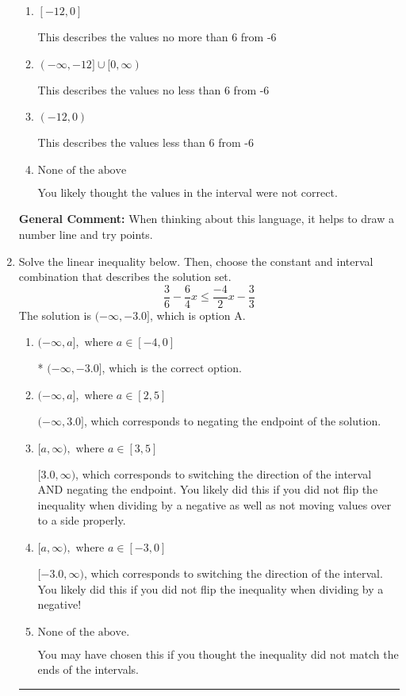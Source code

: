 \documentclass{extbook}[14pt]
\newcommand{\litem}[1]{\item #1

\rule{\textwidth}{0.4pt}}
\begin{document}
\begin{enumerate}
{\begin{enumerate}[label=\Alph*.]
This describes the values more than 6 from -6
\item \( [-12, 0] \)

This describes the values no more than 6 from -6
\item \( (-\infty, -12] \cup [0, \infty) \)

This describes the values no less than 6 from -6
\item \( (-12, 0) \)

This describes the values less than 6 from -6
\item \( \text{None of the above} \)

You likely thought the values in the interval were not correct.
\end{enumerate}

\textbf{General Comment:} When thinking about this language, it helps to draw a number line and try points.
}
\litem{
Solve the linear inequality below. Then, choose the constant and interval combination that describes the solution set.
\[ \frac{3}{6} - \frac{6}{4} x \leq \frac{-4}{2} x - \frac{3}{3} \]
The solution is \( (-\infty, -3.0] \), which is option A.\begin{enumerate}[label=\Alph*.]
\item \( (-\infty, a], \text{ where } a \in [-4, 0] \)

* $(-\infty, -3.0]$, which is the correct option.
\item \( (-\infty, a], \text{ where } a \in [2, 5] \)

 $(-\infty, 3.0]$, which corresponds to negating the endpoint of the solution.
\item \( [a, \infty), \text{ where } a \in [3, 5] \)

 $[3.0, \infty)$, which corresponds to switching the direction of the interval AND negating the endpoint. You likely did this if you did not flip the inequality when dividing by a negative as well as not moving values over to a side properly.
\item \( [a, \infty), \text{ where } a \in [-3, 0] \)

 $[-3.0, \infty)$, which corresponds to switching the direction of the interval. You likely did this if you did not flip the inequality when dividing by a negative!
\item \( \text{None of the above}. \)

You may have chosen this if you thought the inequality did not match the ends of the intervals.
\end{enumerate}

}
\end{enumerate}
\end{document}
